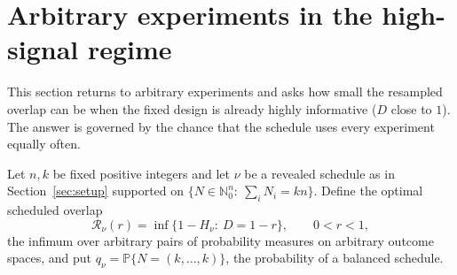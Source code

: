 \documentclass[11pt,a4paper]{article}
\theoremstyle{definition}\newtheorem{definition}[theorem]{Definition}
\theoremstyle{remark}\newtheorem{remark}[theorem]{Remark}
\newcommand{\PP}{\mathbb P}
\newcommand{\NN}{\mathbb N_0}
\begin{document}
\section{Arbitrary experiments in the high-signal regime}\label{sec:strongall}
This section returns to arbitrary experiments and asks how small the resampled overlap can be when the fixed design is already highly informative ($D$ close to $1$). The answer is governed by the chance that the schedule uses every experiment equally often.

Let $n,k$ be fixed positive integers and let $\nu$ be a revealed schedule as in Section~\ref{sec:setup} supported on $\{N\in\NN^n:\ \sum_iN_i=kn\}$. Define the optimal scheduled overlap
\[
\mathcal R_\nu(r)=\inf\{1-H_\nu:\ D=1-r\},\qquad 0<r<1,
\]
the infimum over arbitrary pairs of probability measures on arbitrary outcome spaces, and put $q_\nu=\PP\{N=(k,\ldots,k)\}$, the probability of a balanced schedule.
\end{document}
